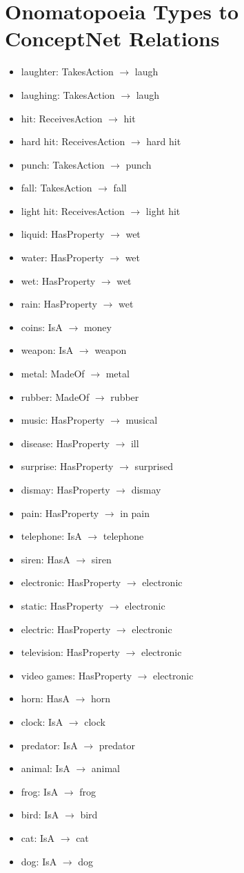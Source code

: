\section{Onomatopoeia Types to ConceptNet Relations}
\label{sec:ono-relation}
\begin{itemize}
\item{laughter: TakesAction $\rightarrow$ laugh}
\item{laughing: TakesAction $\rightarrow$ laugh}
\item{hit: ReceivesAction $\rightarrow$ hit}
\item{hard hit: ReceivesAction $\rightarrow$ hard hit}
\item{punch: TakesAction $\rightarrow$ punch}
\item{fall: TakesAction $\rightarrow$ fall}
\item{light hit: ReceivesAction $\rightarrow$ light hit}
\item{liquid: HasProperty $\rightarrow$ wet}
\item{water: HasProperty $\rightarrow$ wet}
\item{wet: HasProperty $\rightarrow$ wet}
\item{rain: HasProperty $\rightarrow$ wet}
\item{coins: IsA $\rightarrow$ money}
\item{weapon: IsA $\rightarrow$ weapon}
\item{metal: MadeOf $\rightarrow$ metal}
\item{rubber: MadeOf $\rightarrow$ rubber}
\item{music: HasProperty $\rightarrow$ musical}
\item{disease: HasProperty $\rightarrow$ ill}
\item{surprise: HasProperty $\rightarrow$ surprised}
\item{dismay: HasProperty $\rightarrow$ dismay}
\item{pain: HasProperty $\rightarrow$ in pain}
\item{telephone: IsA $\rightarrow$ telephone}
\item{siren: HasA $\rightarrow$ siren}
\item{electronic: HasProperty $\rightarrow$ electronic}
\item{static: HasProperty $\rightarrow$ electronic}
\item{electric: HasProperty $\rightarrow$ electronic}
\item{television: HasProperty $\rightarrow$ electronic}
\item{video games: HasProperty $\rightarrow$ electronic}
\item{horn: HasA $\rightarrow$ horn}
\item{clock: IsA $\rightarrow$ clock}
\item{predator: IsA $\rightarrow$ predator}
\item{animal: IsA $\rightarrow$ animal}
\item{frog: IsA $\rightarrow$ frog}
\item{bird: IsA $\rightarrow$ bird}
\item{cat: IsA $\rightarrow$ cat}
\item{dog: IsA $\rightarrow$ dog}
\end{itemize}


